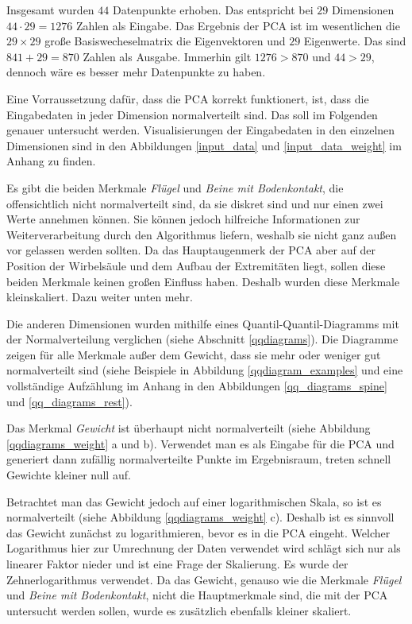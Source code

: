  Insgesamt wurden $44$ Datenpunkte erhoben. Das entspricht bei $29$ Dimensionen $44 \cdot 29 = 1276$ Zahlen als Eingabe. Das Ergebnis der PCA ist im wesentlichen die $29 \times 29$ große Basiswecheselmatrix \bzw die Eigenvektoren und $29$ Eigenwerte. Das sind $841 + 29 = 870$ Zahlen als Ausgabe. Immerhin gilt $1276 > 870$ und $44 > 29$, dennoch wäre es besser mehr Datenpunkte zu haben.
 
 Eine Vorraussetzung dafür, dass die PCA korrekt funktionert, ist, dass die Eingabedaten in jeder Dimension normalverteilt sind. Das soll im Folgenden genauer untersucht werden. Visualisierungen der Eingabedaten in den einzelnen Dimensionen sind in den Abbildungen \ref{input_data} und \ref{input_data_weight} im Anhang zu finden.
 
 Es gibt die beiden Merkmale \emph{Flügel} und \emph{Beine mit Bodenkontakt}, die offensichtlich nicht normalverteilt sind, da sie diskret sind und nur einen \bzw zwei Werte annehmen können. Sie können jedoch hilfreiche Informationen zur Weiterverarbeitung durch den Algorithmus liefern, weshalb sie nicht ganz außen vor gelassen werden sollten. Da das Hauptaugenmerk der PCA aber auf der Position der Wirbelsäule und dem Aufbau der Extremitäten liegt, sollen diese beiden Merkmale keinen großen Einfluss haben. Deshalb wurden diese Merkmale kleinskaliert. Dazu weiter unten mehr.
 
 Die anderen Dimensionen wurden mithilfe eines Quantil-Quantil-Diagramms mit der Normalverteilung verglichen (siehe Abschnitt \ref{qqdiagrams}).
 Die Diagramme zeigen für alle Merkmale außer dem Gewicht, dass sie mehr oder weniger gut normalverteilt sind (siehe Beispiele in Abbildung \ref{qqdiagram_examples} und eine vollständige Aufzählung im Anhang in den Abbildungen \ref{qq_diagrams_spine} und \ref{qq_diagrams_rest}).
 
 Das Merkmal \emph{Gewicht} ist überhaupt nicht normalverteilt (siehe Abbildung \ref{qqdiagrams_weight} a und b). Verwendet man es als Eingabe für die PCA und generiert dann zufällig normalverteilte Punkte im Ergebnisraum, treten schnell Gewichte kleiner null auf.
 
 Betrachtet man das Gewicht jedoch auf einer logarithmischen Skala, so ist es normalverteilt (siehe Abbildung \ref{qqdiagrams_weight} c). Deshalb ist es sinnvoll das Gewicht zunächst zu logarithmieren, bevor es in die PCA eingeht.
 Welcher Logarithmus hier zur Umrechnung der Daten verwendet wird schlägt sich nur als linearer Faktor nieder und ist eine Frage der Skalierung. Es wurde der Zehnerlogarithmus verwendet. 
 Da das Gewicht, genauso wie die Merkmale \emph{Flügel} und \emph{Beine mit Bodenkontakt}, nicht die Hauptmerkmale sind, die mit der PCA untersucht werden sollen, wurde es zusätzlich ebenfalls kleiner skaliert.
 
